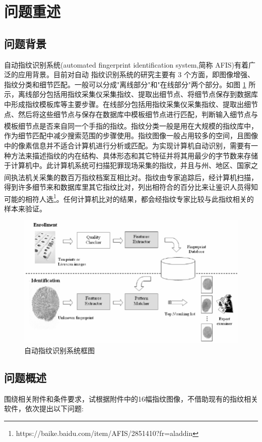 \documentclass{whutmod}
\newcommand{\upcite}[1]{\textsuperscript{\cite{#1}}}
\begin{document}
	
	\section{问题重述}	
		\subsection{问题背景}
	
自动指纹识别系统(automated fingerprint identification system,简称 AFIS)有着广泛的应用背景。目前对自动 指纹识别系统的研究主要有 3 个方面，即图像增强、指纹分类和细节匹配。一般可以分成"离线部分"和"在线部分"两个部分。如图 \ref{lssct} 所示，离线部分包括用指纹采集仪采集指纹、提取出细节点、将细节点保存到数据库中形成指纹模板库等主要步骤。在线部分包括用指纹采集仪采集指纹、提取出细节点、然后将这些细节点与保存在数据库中模板细节点进行匹配，判断输入细节点与模板细节点是否来自同一个手指的指纹\upcite{1,3}。指纹分类一般是用在大规模的指纹库中，作为细节匹配中减少搜索范围的步骤使用。指纹图像一般占用较多的空间，且图像中的像素信息并不适合计算机进行分析或匹配。为实现计算机自动识别，需要有一种方法来描述指纹的内在结构、具体形态和其它特征并将其用最少的字节数来存储于计算机中。此计算机系统可扫描犯罪现场采集的指纹，并且与州、地区、国家之间执法机关采集的数百万指纹档案互相比对\upcite{2}。指纹由专家追踪后，经计算机扫描，得到许多细节来和数据库里其它指纹比对，列出相符合的百分比来让鉴识人员得知可能的相符人选\footnote{\quad https://baike.baidu.com/item/AFIS/2851410?fr=aladdin}。任何计算机比对的结果，都会经指纹专家比较与此指纹相关的样本来验证。
\begin{figure}[H]
	\centering
	\includegraphics[width=.8\textwidth]{figures/AFIS.png}
	\caption{自动指纹识别系统框图 }\label{lssct}
\end{figure}

		\subsection{问题概述}
		    围绕相关附件和条件要求，试根据附件中的16幅指纹图像，不借助现有的指纹相关软件，依次提出以下问题:
				 
\end{document}
